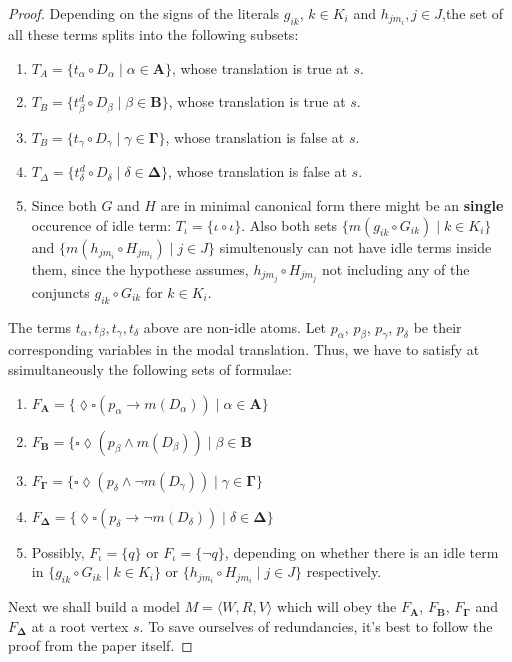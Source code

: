 \documentclass[10pt]{article}
\newcommand{\move}{\lozenge}
\newcommand{\Move}{\square}
\newcommand{\id}{\iota}
\begin{document}
\begin{proof}
			Depending on the signs of the literals $g_{ik}$, $k\in K_i$ and $h_{jm_i} ,j \in J$,the set of all these terms splits into the following subsets:
			
			\begin{enumerate}
				\item $T_A = \{t_\alpha \circ D_\alpha \mid \alpha \in \textbf{A}\}$, whose translation is true at $s$.
				\item $T_B = \{t^d_\beta \circ D_\beta  \mid \beta \in \textbf{B}\}$, whose translation is true at $s$.
				\item $T_B = \{t_\gamma \circ D_\gamma  \mid \gamma \in \mathbf{\Gamma}\}$, whose translation is false at $s$.
				\item $T_\Delta = \{t^d_\delta \circ D_\delta  \mid \delta \in \mathbf{\Delta}\}$, whose translation is false at $s$.
				\item Since both $G$ and $H$ are in minimal canonical form there might be an \textbf{single} occurence of idle term: $T_\id = \{\id\circ\id\}$. Also both sets $\{m(g_{ik} \circ G_{ik})\mid k\in K_i\}$ and $\{m(h_{jm_i} \circ H_{jm_i})\mid j \in J\}$ simultenously can not have idle terms inside them, since the hypothese assumes, $h_{jm_j} \circ H_{jm_j}$ not including any of the conjuncts $g_{ik} \circ G_{ik}$ for $k\in K_i$.
			\end{enumerate}
			
			The terms $t_\alpha,t_\beta,t_\gamma,t_\delta$ above are non-idle atoms. Let $p_\alpha$, $p_\beta$, $p_\gamma$, $p_\delta$ be
			their corresponding variables in the modal translation. Thus, we have to satisfy at ssimultaneously the following sets of formulae:
			
			\begin{enumerate}
				\item $F_\mathbf{A} = \{\move\Move(p_\alpha \rightarrow m(D_\alpha)) \mid \alpha \in \textbf{A}\}$
				\item $F_\mathbf{B} = \{\Move\move(p_\beta \land m(D_\beta)) \mid \beta\in \textbf{B}$
				\item $F_\mathbf{\Gamma} = \{\Move\move(p_\delta \land \neg m(D_\gamma)) \mid \gamma \in \mathbf{\Gamma}\}$
				\item $F_\mathbf{\Delta} = \{\move\Move(p_\delta \rightarrow \neg m(D_\delta)) \mid \delta \in \mathbf{\Delta}\}$
				\item Possibly, $F_\id=\{q\}$ or $F_\id = \{\neg q\}$, depending on whether there is an idle term in $\{g_{ik} \circ G_{ik} \mid k\in K_i\}$ or $\{h_{jm_i} \circ H_{jm_i}\mid j \in J\}$ respectively.
				\end{enumerate}
			
			Next we shall build a model $M= \langle W,R,V\rangle$ which will obey the $F_\mathbf{A}$, $F_\mathbf{B}$, $F_\mathbf{\Gamma}$ and $F_\mathbf{\Delta}$ at a root vertex $s$. To save ourselves of redundancies, it's best to follow the proof from the paper itself. 
		\end{proof}
		
\end{document}
